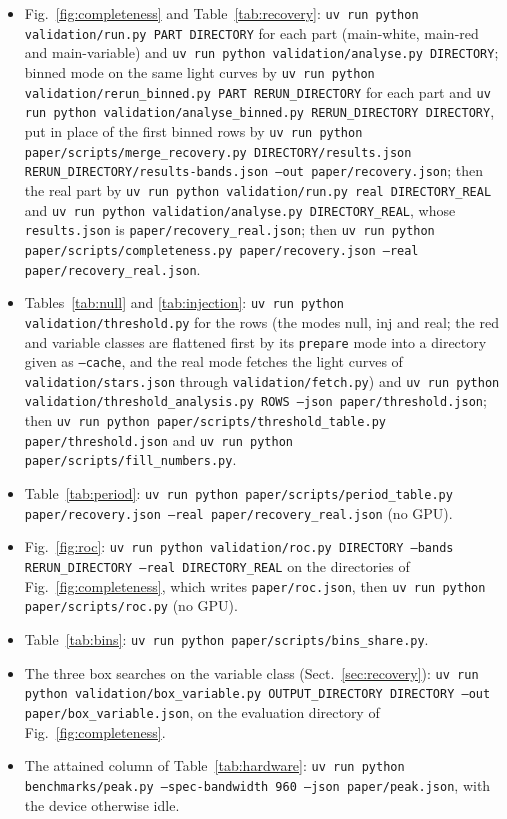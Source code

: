 \documentclass{aastex631}
\begin{document}
\begin{itemize}
\item Fig.~\ref{fig:completeness} and Table~\ref{tab:recovery}: \texttt{uv run python validation/run.py PART DIRECTORY} for each part (main-white, main-red and main-variable) and \texttt{uv run python validation/analyse.py DIRECTORY}; binned mode on the same light curves by \texttt{uv run python validation/rerun\_binned.py PART RERUN\_DIRECTORY} for each part and \texttt{uv run python validation/analyse\_binned.py RERUN\_DIRECTORY DIRECTORY}, put in place of the first binned rows by \texttt{uv run python paper/scripts/merge\_recovery.py DIRECTORY/results.json RERUN\_DIRECTORY/results-bands.json --out paper/recovery.json}; then the real part by \texttt{uv run python validation/run.py real DIRECTORY\_REAL} and \texttt{uv run python validation/analyse.py DIRECTORY\_REAL}, whose \texttt{results.json} is \texttt{paper/recovery\_real.json}; then \texttt{uv run python paper/scripts/completeness.py paper/recovery.json --real paper/recovery\_real.json}.
\item Tables~\ref{tab:null} and \ref{tab:injection}: \texttt{uv run python validation/threshold.py} for the rows (the modes null, inj and real; the red and variable classes are flattened first by its \texttt{prepare} mode into a directory given as \texttt{--cache}, and the real mode fetches the light curves of \texttt{validation/stars.json} through \texttt{validation/fetch.py}) and \texttt{uv run python validation/threshold\_analysis.py ROWS --json paper/threshold.json}; then \texttt{uv run python paper/scripts/threshold\_table.py paper/threshold.json} and \texttt{uv run python paper/scripts/fill\_numbers.py}.
\item Table~\ref{tab:period}: \texttt{uv run python paper/scripts/period\_table.py paper/recovery.json --real paper/recovery\_real.json} (no GPU).
\item Fig.~\ref{fig:roc}: \texttt{uv run python validation/roc.py DIRECTORY --bands RERUN\_DIRECTORY --real DIRECTORY\_REAL} on the directories of Fig.~\ref{fig:completeness}, which writes \texttt{paper/roc.json}, then \texttt{uv run python paper/scripts/roc.py} (no GPU).
\item Table~\ref{tab:bins}: \texttt{uv run python paper/scripts/bins\_share.py}.
\item The three box searches on the variable class (Sect.~\ref{sec:recovery}): \texttt{uv run python validation/box\_variable.py OUTPUT\_DIRECTORY DIRECTORY --out paper/box\_variable.json}, on the evaluation directory of Fig.~\ref{fig:completeness}.
\item The attained column of Table~\ref{tab:hardware}: \texttt{uv run python benchmarks/peak.py --spec-bandwidth 960 --json paper/peak.json}, with the device otherwise idle.

\end{itemize}
\end{document}
